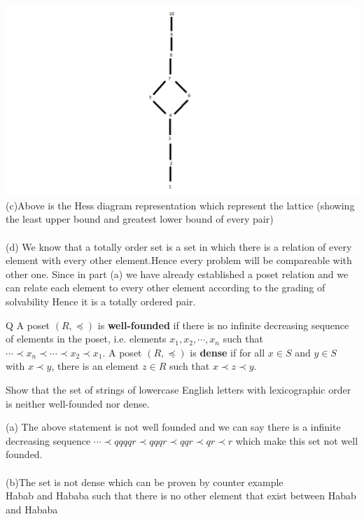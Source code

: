 \documentclass[addpoints]{exam}
\begin{document}
\begin{questions}
\begin{solution}
    \includegraphics[scale=0.5]{discrete.png}\\
    (c)Above is the Hess diagram representation which represent the lattice (showing the least upper bound and greatest lower bound of every pair)\\
    \\
    (d) We know that a totally order set is a set  in which there is a relation of every element with every other element.Hence every problem will be compareable with other one. Since in part (a) we have already established a poset relation and we can relate each element to every other element according to the grading of solvability Hence it is a totally ordered pair.
     \end{solution}
 Q  
\question 
A poset $(R, \preccurlyeq)$ is \textbf{well-founded} if there is no infinite decreasing sequence of elements in the poset, i.e. elements $x_1, x_2, \cdots, x_n$ such that $\cdots \prec x_n \prec \cdots  \prec x_2 \prec x_1$. A poset $(R, \preccurlyeq)$ is \textbf{dense} if for all $x \in S$ and $y \in S$ with $x \prec y$, there is an element $z \in R$ such that $x \prec z \prec y$.

Show that the set of strings of lowercase English letters with lexicographic order is neither well-founded nor dense.


  \begin{solution}
  (a) The above statement is not well founded and we can say there is a infinite decreasing sequence $\cdots \prec qqqqr  \prec qqqr \prec qqr  \prec qr \prec r$ which make this set not well founded.\\
 \\
 (b)The set is not dense which can be proven by counter example\\
 Habab and Hababa such that there is no other element that exist between Habab and Hababa\\
  \end{solution}


\end{questions}
\end{document}

